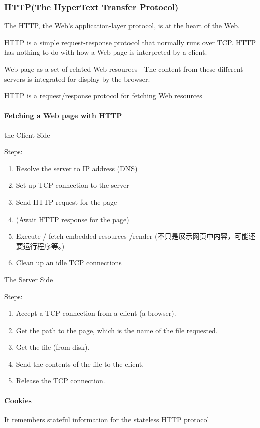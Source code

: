 \subsubsection{HTTP(The HyperText Transfer Protocol)}
The HTTP, the Web's application-layer protocol, is at the heart of the
Web.

HTTP is a simple request-response protocol that normally runs over
TCP. HTTP has nothing to do with how a Web page is interpreted by a client.


Web page as a set of related Web resources  The content from these different servers is integrated for display by the browser.

HTTP is a request/response protocol for fetching Web resources

\paragraph{Fetching a Web page with HTTP}\quad
the Client Side

Steps:
\begin{enumerate}
    \item Resolve the server to IP address (DNS)
    \item Set up TCP connection to the server
    \item Send HTTP request for the page
    \item (Await HTTP response for the page)
    \item Execute / fetch embedded resources /render (不只是展示网页中内容，可能还要运行程序等。)
    \item Clean up an idle TCP connections
\end{enumerate}

The Server Side

Steps:
\begin{enumerate}
    \item Accept a TCP connection from a client (a browser).
    \item Get the path to the page, which is the name of the file requested.
    \item Get the file (from disk).
    \item Send the contents of the file to the client.
    \item Release the TCP connection.
\end{enumerate}

\paragraph{Cookies}It remembers stateful information for the stateless HTTP protocol

